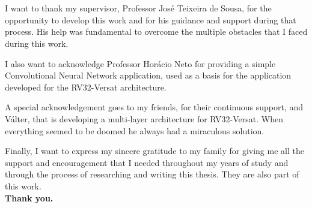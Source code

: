
\section*{\acknowledgments}


I want to thank my supervisor, Professor José Teixeira de Sousa, for the 
opportunity to develop this work and for his guidance and support during that process. 
His help was fundamental to overcome the multiple obstacles that I faced during this work.

I also want to acknowledge Professor Horácio Neto for providing a simple Convolutional 
Neural Network application, used as a basis for the application developed for the 
RV32-Versat architecture.

A special acknowledgement goes to my friends, for their continuous support, and Válter,  
that is developing a multi-layer architecture for RV32-Versat. When everything seemed to 
be doomed he always had a miraculous solution.

Finally, I want to express my sincere gratitude to my family for giving me all the 
support and encouragement that I needed throughout my years of study and through the 
process of researching and writing this thesis. They are also part of this work.\\

\textbf{Thank you.}


